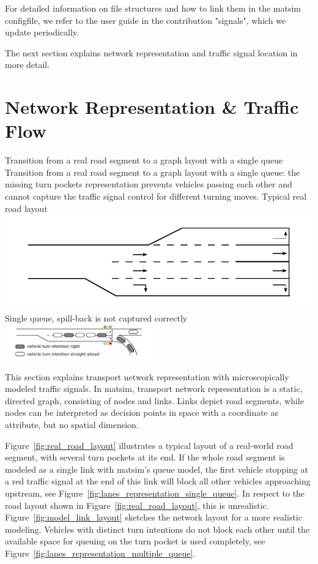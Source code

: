 For detailed information on file structures and how to link them in the \gls{matsim} \gls{configfile}, we refer to the user guide in the contribution "signals", which we update periodically.

The next section explains network representation and traffic signal location in more detail. 

\section{Network Representation \& Traffic Flow}
\label{sec:signals_network_traffic_flow}

\createfigure%
{Transition from a real road segment to a graph layout with a single queue}%
{Transition from a real road segment to a graph layout with a single queue: the missing turn pockets representation prevents vehicles passing each other and cannot capture the traffic signal control for different turning moves. }
{\label{fig:combined_model}}
{%
  \createsubfigure%
	{Typical real road layout}
	{\includegraphics[width=0.475\linewidth]{extending/figures/signalslanes/real_road_layout.pdf}}
	{\label{fig:real_road_layout}}
  \createsubfigure%
	{Single queue, spill-back is not captured correctly}%
	{\includegraphics[width=0.48\textwidth]{extending/figures/signalslanes/single_queue_model_inkscape.pdf}}%
	{\label{fig:lanes_representation_single_queue}}%
}%
{\citet{GretherNeumannNagel2012SignalsQueueModelABMTrans}}

This section explains transport network representation with microscopically modeled traffic signals. 
In \gls{matsim}, transport network representation is a static, directed graph, consisting of nodes and links. 
Links depict road segments, while nodes can be interpreted as decision points in space with a coordinate as attribute, but no spatial dimension. 

Figure~\ref{fig:real_road_layout} illustrates a typical layout of a real-world road segment, with several turn pockets at its end. 
If the whole road segment is modeled as a single link with \gls{matsim}'s queue model, the first vehicle stopping at a red traffic signal at the end of this link will block all other vehicles approaching upstream, see Figure~\ref{fig:lanes_representation_single_queue}. 
In respect to the road layout shown in Figure~\ref{fig:real_road_layout}, this is unrealistic. 
Figure~\ref{fig:model_link_layout} sketches the network layout for a more realistic modeling. 
Vehicles with distinct turn intentions do not block each other until the available space for queuing on the turn pocket is used completely, see Figure~\ref{fig:lanes_representation_multiple_queue}. 

